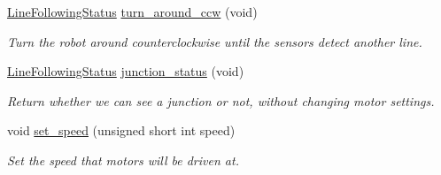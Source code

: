 \begin{DoxyCompactItemize}
\hyperlink{namespaceIDP_a5993bdfdd901fc5521c8df42dca43bd0}{LineFollowingStatus} \hyperlink{classIDP_1_1LineFollowing_a3156dca6ebcbee20933949137dba6cf6}{turn\_\-around\_\-ccw} (void)
\begin{DoxyCompactList}\small\item\em Turn the robot around counterclockwise until the sensors detect another line. \item\end{DoxyCompactList}\item 
\hyperlink{namespaceIDP_a5993bdfdd901fc5521c8df42dca43bd0}{LineFollowingStatus} \hyperlink{classIDP_1_1LineFollowing_af4feccda1b15ebbdad8dd49178b28914}{junction\_\-status} (void)
\begin{DoxyCompactList}\small\item\em Return whether we can see a junction or not, without changing motor settings. \item\end{DoxyCompactList}\item 
void \hyperlink{classIDP_1_1LineFollowing_af034f457aef1716d042606c71dddfd73}{set\_\-speed} (unsigned short int speed)
\begin{DoxyCompactList}\small\item\em Set the speed that motors will be driven at. \item\end{DoxyCompactList}\end{DoxyCompactItemize}

